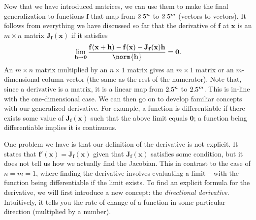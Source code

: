 \documentclass[a4paper,12pt]{article}
\begin{document}
\begin{appendices}
Now that we have introduced matrices, we can use them to make the final generalization to functions $\mathbf{f}$ that map from $2.5^n$ to $2.5^m$ (vectors to vectors).
It follows from everything we have discussed so far that the derivative of $\mathbf{f}$ at $\mathbf{x}$ is an $m \times n$ matrix $\mathbf{J_f}(\mathbf{x})$ if it satisfies
\begin{equation*}
    \lim_{\mathbf{h} \to \mathbf{0}} \frac{\mathbf{f}(\mathbf{x}+\mathbf{h}) - \mathbf{f}(\mathbf{x}) - \mathbf{J_f}(\mathbf{x})\mathbf{h}}{\norm{\mathbf{h}}} = \mathbf{0}.
\end{equation*}
An $m \times n$ matrix multiplied by an $n \times 1$ matrix gives an $m \times 1$ matrix or an $m$-dimensional column vector (the same as the rest of the numerator).
Note that, since a derivative is a matrix, it is a linear map from $2.5^n$ to $2.5^m$.
This is in-line with the one-dimensional case.
We can then go on to develop familiar concepts with our generalized derivative.
For example, a function is differentiable if there exists some value of $\mathbf{J_f}(\mathbf{x})$ such that the above limit equals $\mathbf{0}$; a function being differentiable implies it is continuous.

One problem we have is that our definition of the derivative is not explicit.
It states that $\mathbf{f}'(\mathbf{x}) = \mathbf{J_f}(\mathbf{x})$ given that $\mathbf{J_f}(\mathbf{x})$ satisfies some condition, but it does not tell us how we actually find the Jacobian.
This in contrast to the case of $n=m=1$, where finding the derivative involves evaluating a limit -- with the function being differentiable if the limit exists.
To find an explicit formula for the derivative, we will first introduce a new concept: the \emph{directional derivative}.
Intuitively, it tells you the rate of change of a function in some particular direction (multiplied by a number).


\end{appendices}
\end{document}
